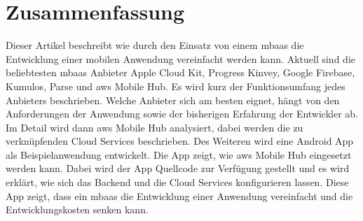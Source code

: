 \section{Zusammenfassung}
Dieser Artikel beschreibt wie durch den Einsatz von einem \gls{mbaas} die Entwicklung einer mobilen Anwendung vereinfacht werden kann. Aktuell sind die beliebtesten \gls{mbaas} Anbieter Apple Cloud Kit, Progress Kinvey, Google Firebase, Kumulos, Parse  und \gls{aws} Mobile Hub. Es wird kurz der Funktionsumfang jedes Anbieters beschrieben. Welche Anbieter sich am besten eignet, hängt von den Anforderungen der Anwendung sowie der bisherigen Erfahrung der Entwickler ab. Im Detail wird dann \gls{aws} Mobile Hub analysiert, dabei werden die zu verknüpfenden Cloud Services beschrieben. Des Weiteren wird eine Android App als Beispielanwendung entwickelt. Die App zeigt, wie \gls{aws} Mobile Hub eingesetzt werden kann. Dabei wird der App Quellcode zur Verfügung gestellt und es wird erklärt, wie sich das Backend und die Cloud Services konfigurieren lassen. Diese App zeigt, dass ein \gls{mbaas} die Entwicklung einer Anwendung vereinfacht und die Entwicklungskosten senken kann.  